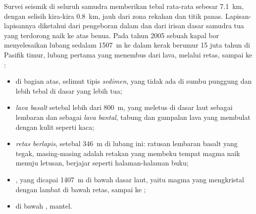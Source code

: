Survei seismik di seluruh samudra memberikan tebal rata-rata 
sebesar \qty{7.1}{km}, dengan selisih kira-kira \qty{0.8}{km}, jauh dari zona
rekahan dan titik panas. Lapisan-lapisannya diketahui dari pengeboran dalam dan
dari irisan dasar samudra tua yang terdorong naik ke atas benua. Pada tahun 2005
sebuah kapal bor menyelesaikan lubang sedalam \qty{1507}{m} ke dalam kerak
berumur 15 juta tahun di Pasifik timur, lubang pertama yang menembus dari lava,
melalui retas, sampai ke :

\begin{itemize}
  \item di bagian atas, selimut tipis \emph{sedimen}, yang tidak ada di sumbu
        punggung dan lebih tebal di dasar yang lebih tua;
  \item \emph{lava basalt} setebal lebih dari \qty{800}{m}, yang meletus di
        dasar laut sebagai lembaran dan sebagai \emph{lava bantal}, tabung dan
        gumpalan lava yang membulat dengan kulit seperti kaca;
  \item \emph{retas berlapis}, setebal \qty{346}{m} di lubang ini: ratusan
        lembaran basalt yang tegak, masing-masing adalah retakan yang membeku
        tempat magma naik menuju letusan, berjajar seperti halaman-halaman buku;
  \item \emph{}, yang dicapai \qty{1407}{m} di bawah dasar laut, yaitu
        magma yang mengkristal dengan lambat di bawah retas, sampai ke ;
  \item di bawah , \emph{} mantel.
\end{itemize}

